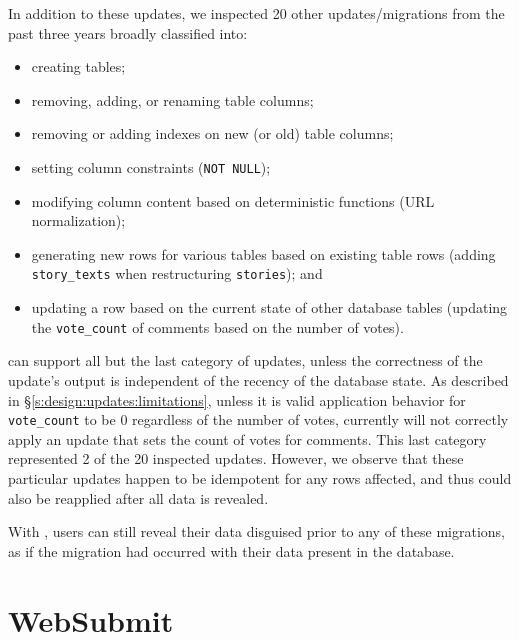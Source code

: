 %
In addition to these updates, we inspected 20 other updates/migrations from the past
three years broadly classified into:
\begin{itemize}[nosep]
\item creating tables; 
\item removing, adding, or renaming table columns;
\item removing or adding indexes on new (or old) table columns; 
\item setting column constraints (\eg \texttt{NOT NULL}); 
\item modifying column content based on deterministic functions (\eg URL normalization); 
\item generating new rows for various tables based on existing table rows (\eg adding \texttt{story\_texts}  
when restructuring \texttt{stories}); and
\item updating a row based on the current state of other database tables (\eg updating
the \texttt{vote\_count} of comments based on the number of votes).
\end{itemize}
%
\sys can support all but the last category of updates, unless the correctness of
the update's output is independent of the recency of the database state. As
described in \S\ref{s:design:updates:limitations}, unless it is valid
application behavior for \eg \texttt{vote\_count} to be 0 regardless of the
number of votes, \sys currently will not correctly apply an update that sets the
count of votes for comments.  This last category represented 2 of the 20
inspected updates.  However, we observe that these particular updates happen to
be idempotent for any rows affected, and thus could also be reapplied after all
data is revealed.
%

%
With \sys, users can still reveal their data disguised prior to any of these
migrations, as if the migration had occurred with their data present in the
database.


\section{WebSubmit}
\label{s:case-websubmit}

